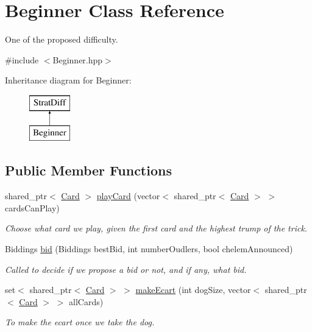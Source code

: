 \hypertarget{classBeginner}{\section{\-Beginner \-Class \-Reference}
\label{classBeginner}
}


\-One of the proposed difficulty.  




{\ttfamily \#include $<$\-Beginner.\-hpp$>$}

\-Inheritance diagram for \-Beginner\-:\begin{figure}[H]
\begin{center}
\leavevmode
\includegraphics[height=2.000000cm]{classBeginner}
\end{center}
\end{figure}
\subsection*{\-Public \-Member \-Functions}
\begin{DoxyCompactItemize}
\item 
shared\-\_\-ptr$<$ \hyperlink{classCard}{\-Card} $>$ \hyperlink{classBeginner_abc1ffca26bacf167229357e02ff1d145}{play\-Card} (vector$<$ shared\-\_\-ptr$<$ \hyperlink{classCard}{\-Card} $>$ $>$ cards\-Can\-Play)
\begin{DoxyCompactList}\small\item\em \-Choose what card we play, given the first card and the highest trump of the trick. \end{DoxyCompactList}\item 
\-Biddings \hyperlink{classBeginner_a742825d7c3629507b7486f7bb9ae5544}{bid} (\-Biddings best\-Bid, int number\-Oudlers, bool chelem\-Announced)
\begin{DoxyCompactList}\small\item\em \-Called to decide if we propose a bid or not, and if any, what bid. \end{DoxyCompactList}\item 
set$<$ shared\-\_\-ptr$<$ \hyperlink{classCard}{\-Card} $>$ $>$ \hyperlink{classBeginner_a4901aba2405a6b7ec3a5ab8daf5fe05c}{make\-Ecart} (int dog\-Size, vector$<$ shared\-\_\-ptr$<$ \hyperlink{classCard}{\-Card} $>$ $>$ all\-Cards)
\begin{DoxyCompactList}\small\item\em \-To make the ecart once we take the dog. \end{DoxyCompactList}\end{DoxyCompactItemize}


